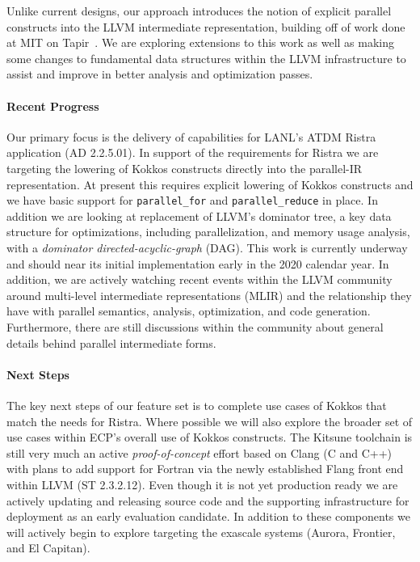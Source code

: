 Unlike current designs, our approach introduces the notion of explicit
parallel constructs into the LLVM intermediate representation, building
off of work done at MIT on Tapir~\cite{2.3.6.01:kitsune:Schardl:2017}. 
We are exploring extensions to this work as well as making some changes
to fundamental data structures within the LLVM infrastructure to assist
and improve in better analysis and optimization passes. 

\paragraph{Recent Progress}

Our primary focus is the delivery of capabilities for LANL's ATDM
Ristra application (AD 2.2.5.01).  In support of the requirements for
Ristra we are targeting the lowering of Kokkos constructs directly
into the parallel-IR representation.  At present this requires
explicit lowering of Kokkos constructs and we have basic support
for \texttt{parallel\_for} and \texttt{parallel\_reduce} in place.  In
addition we are looking at replacement of LLVM's dominator tree, a key
data structure for optimizations, including parallelization, and
memory usage analysis, with a \emph{dominator directed-acyclic-graph}
(DAG).  This work is currently underway and should near its initial
implementation early in the 2020 calendar year.  In addition, we are
actively watching recent events within the LLVM community around
multi-level intermediate representations (MLIR) and the relationship
they have with parallel semantics, analysis, optimization, and code
generation.  Furthermore, there are still discussions within the
community about general details behind parallel intermediate forms. 

\paragraph{Next Steps}

The key next steps of our feature set is to complete use cases of
Kokkos that match the needs for Ristra.  Where possible we will also
explore the broader set of use cases within ECP's overall use of
Kokkos constructs.  The Kitsune toolchain is still very much an
active \emph{proof-of-concept} effort based on Clang (C and C++) with
plans to add support for Fortran via the newly established Flang front
end within LLVM (ST 2.3.2.12).  Even though it is not yet production
ready we are actively updating and releasing source code and the supporting
infrastructure for deployment as an early evaluation candidate.  In
addition to these components we will actively begin to explore targeting
the exascale systems (Aurora, Frontier, and El Capitan).

